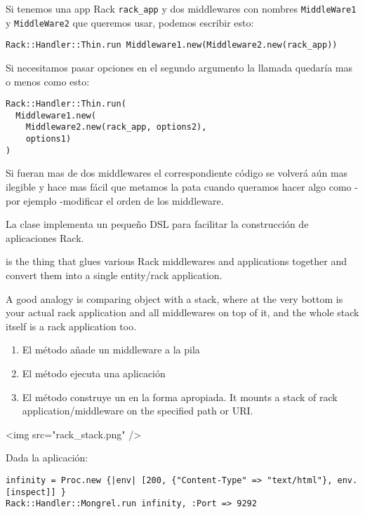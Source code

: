 Si tenemos una app Rack \verb|rack_app| 
y dos middlewares con nombres
\verb|MiddleWare1|
y
\verb|MiddleWare2| que queremos usar, podemos escribir esto:
\begin{verbatim}
Rack::Handler::Thin.run Middleware1.new(Middleware2.new(rack_app))
\end{verbatim}
Si necesitamos pasar opciones en el segundo argumento la llamada quedaría
mas o menos como esto:
\begin{verbatim}
Rack::Handler::Thin.run(
  Middleware1.new(
    Middleware2.new(rack_app, options2),
    options1)
)
\end{verbatim}
Si fueran mas de dos middlewares el correspondiente
código se volverá aún mas ilegible y hace mas fácil que metamos 
la pata cuando queramos hacer algo como  - por ejemplo -modificar 
el orden de los middleware.


La clase \rackbuilder{} implementa un pequeño DSL para facilitar
la construcción de aplicaciones Rack.

\rackbuilder{} is the thing that glues various Rack middlewares
and applications together and convert them into a single entity/rack
application. 

A good analogy is comparing \rackbuilder{} 
object with a stack, where at the very bottom is your actual rack
application and all middlewares on top of it, and the whole stack
itself is a rack application too.

\begin{enumerate}
\item 
El método  añade un middleware a la pila
\item 
El método  ejecuta una aplicación
\item 
El método  construye un \rackurlmap{} en la forma apropiada.
It mounts a stack of rack application/middleware  on the specified path or URI.
\end{enumerate}

\begin{rawhtml}
<img src="rack_stack.png" />
\end{rawhtml}


Dada la aplicación:

\begin{verbatim}
infinity = Proc.new {|env| [200, {"Content-Type" => "text/html"}, env.[inspect]] }
Rack::Handler::Mongrel.run infinity, :Port => 9292
\end{verbatim}

